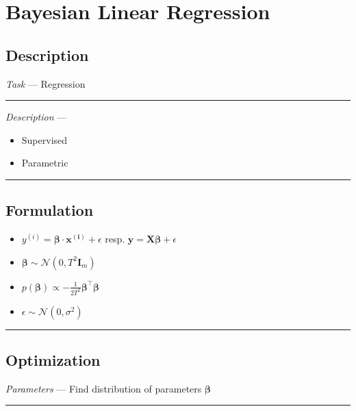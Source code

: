 \section{Bayesian Linear Regression}
\subsection*{Description}
\emph{Task} --- Regression

{\color{lightgray}\hrule height 0.001mm}

\emph{Description} --- 
\begin{itemize}
    \item Supervised 
    \item Parametric
\end{itemize}

{\color{black}\hrule height 0.001mm}

\subsection*{Formulation}

\begin{itemize}
    \item $y^{(i)} = \boldsymbol{\beta} \cdot \boldsymbol{x^{(i)}} + \epsilon$ resp. $\boldsymbol{y} = \boldsymbol{X}\boldsymbol{\beta} + \epsilon$
    \item $\boldsymbol{\beta} \sim \mathcal{N} (0,T^2 \boldsymbol{I}_m)$
    \item $p(\boldsymbol{\beta}) \propto -\frac{1}{2T^2} \boldsymbol{\beta}^\intercal \boldsymbol{\beta}$
    \item $\epsilon \sim \mathcal{N} (0,\sigma^2)$
\end{itemize}

{\color{black}\hrule height 0.001mm}

\subsection*{Optimization}
\emph{Parameters} --- Find distribution of parameters $\boldsymbol{\beta}$

{\color{lightgray}\hrule height 0.001mm}


